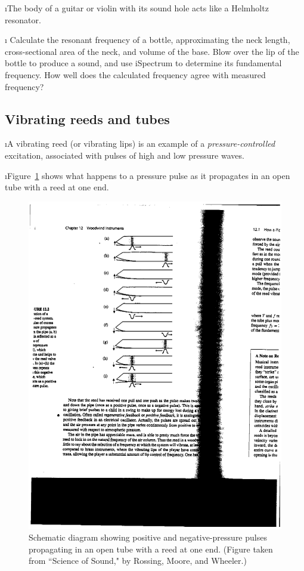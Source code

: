 \i The body of a guitar or violin with its sound hole acts
like a Helmholtz resonator.

\i \demo
Calculate the resonant frequency of a bottle,
approximating the neck length, cross-sectional area of the
neck, and volume of the base.
Blow over the lip of the bottle to produce a sound, and
use iSpectrum to determine its fundamental frequency.
How well does the calculated frequency agree 
with measured frequency?

\ei
\subsection{Vibrating reeds and tubes}
\bi

\i A vibrating reed (or vibrating lips) is an 
example of a {\em pressure-controlled} excitation,
associated with pulses of high and low pressure 
waves.

\i Figure~\ref{f:pipe-reed-system} shows what
happens to a pressure pulse as it propagates in
an open tube with a reed at one end.
%
\begin{figure}[htbp]
\begin{center}
\includegraphics[height=.9\textheight]{pipe-reed-system.pdf}
\caption{Schematic diagram showing 
positive and negative-pressure pulses 
propagating in
an open tube with a reed at one end.
(Figure taken from ``Science of Sound,"
by Rossing, Moore, and Wheeler.)}
\label{f:pipe-reed-system}
\end{center}
\end{figure}

